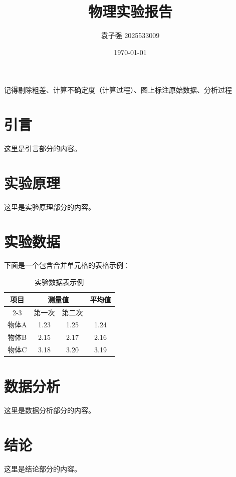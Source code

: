 \documentclass[12pt]{article}
\title{物理实验报告}
\author{袁子强\hspace{1cm} 2025533009}
\date{\today}
\begin{document}
\maketitle
记得剔除粗差、计算不确定度（计算过程）、图上标注原始数据、分析过程
\section{引言}
这里是引言部分的内容。

\section{实验原理}
这里是实验原理部分的内容。

\section{实验数据}
下面是一个包含合并单元格的表格示例：

\begin{table}[htbp]
    \centering
    \caption{实验数据表示例}
    \begin{tabular}{|c|c|c|c|}
        \hline
        \multirow{2}{*}{项目} & \multicolumn{2}{c|}{测量值} & \multirow{2}{*}{平均值}        \\
        \cline{2-3}
                            & 第一次                      & 第二次                  &      \\
        \hline
        物体A                 & 1.23                     & 1.25                 & 1.24 \\
        \hline
        物体B                 & 2.15                     & 2.17                 & 2.16 \\
        \hline
        物体C                 & 3.18                     & 3.20                 & 3.19 \\
        \hline
    \end{tabular}
\end{table}

\section{数据分析}
这里是数据分析部分的内容。

\section{结论}
这里是结论部分的内容。
\end{document}
